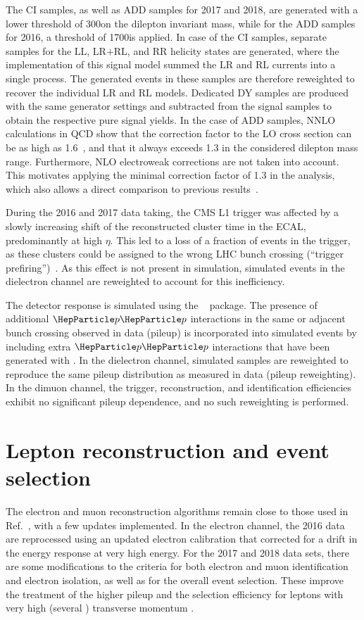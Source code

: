 \documentclass[11pt,twoside,a4paper,cmspaper,final,collab]{cms-tdr}
\begin{document}
The CI samples, as well as ADD samples for 2017 and 2018, are generated with a lower threshold of 300\GeV on the dilepton invariant mass, while for the ADD samples for 2016, a threshold of 1700\GeV is applied. In case of the CI samples, separate samples for the $\text{LL}$, $\text{LR+RL}$, and $\text{RR}$ helicity states are generated, where the \PYTHIA implementation of this signal model summed the $\text{LR}$ and $\text{RL}$ currents into a single process. The generated events in these samples are therefore reweighted to recover the individual $\text{LR}$ and $\text{RL}$ models.
Dedicated \PYTHIA DY samples are produced with the same generator settings and subtracted from the signal samples to obtain the respective pure signal yields. In the case of ADD samples, NNLO calculations in QCD show that the correction factor to the LO cross section can be as high as 1.6~\cite{Ahmed:2017}, and that it always exceeds 1.3 in the considered dilepton mass range. Furthermore, NLO electroweak corrections are not taken into account.
This motivates applying the minimal correction factor of 1.3 in the analysis, which also allows a direct comparison to previous results~\cite{Khachatryan:2014fba}.

During the 2016 and 2017 data taking, the CMS L1 trigger was affected by a slowly increasing shift of the reconstructed cluster time in the ECAL, predominantly at high $\eta$. This led to a loss of a fraction of events in the trigger, as these clusters could be assigned to the wrong LHC bunch crossing (``trigger prefiring'')~\cite{Sirunyan:2020zal}. As this effect is not present in simulation, simulated events in the dielectron channel are reweighted to account for this inefficiency.

The detector response is simulated using the \GEANTfour~\cite{Agostinelli:2002hh} package. The presence of additional $\Pp\Pp$ interactions in the same or adjacent bunch crossing observed in data (pileup) is incorporated into simulated events by including extra $\Pp\Pp$ interactions that have been generated with \PYTHIA.
In the dielectron channel, simulated samples are reweighted to reproduce the same pileup distribution as measured in data (pileup reweighting). In the dimuon channel, the trigger, reconstruction, and identification efficiencies exhibit no significant pileup dependence, and no such reweighting is performed.

\section{Lepton reconstruction and event selection}
\label{sec:objsel}
The electron and muon reconstruction algorithms remain close to those used in Ref.~\cite{Sirunyan:2018exx}, with a few updates implemented. In the electron channel, the 2016 data are reprocessed using an updated electron calibration that corrected for a drift in the energy response at very high energy. For the 2017 and 2018 data sets, there are some modifications to the criteria for both electron and muon identification and electron isolation, as well as for the overall event selection. These improve the treatment of the higher pileup and the selection efficiency for leptons with very high (several \TeVns) transverse momentum \pt. 
\end{document}
